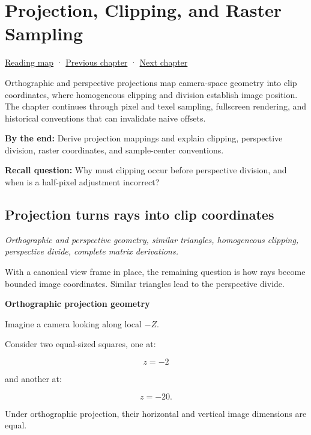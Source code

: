 \hypertarget{02-foundations-ii-ch033}{}
\chapter{Projection, Clipping, and Raster Sampling}\label{stagechapter:02-foundations-ii-ch033}\label{02-foundations-ii-ch033-projection-clipping-and-raster-sampling}

\hyperref[volume-reading-map]{Reading map} · \hyperref[02-foundations-ii-ch032-geometry-becomes-an-image-and-an-inverse-problem]{Previous chapter} · \hyperref[02-foundations-ii-ch034-robust-predicates-and-camera-sensitivity]{Next chapter}

Orthographic and perspective projections map camera-space geometry into clip coordinates, where homogeneous clipping and division establish image position. The chapter continues through pixel and texel sampling, fullscreen rendering, and historical conventions that can invalidate naive offsets.

\textbf{By the end:} Derive projection mappings and explain clipping, perspective division, raster coordinates, and sample-center conventions.

\textbf{Recall question:} Why must clipping occur before perspective division, and when is a half-pixel adjustment incorrect?

\section{Projection turns rays into clip coordinates}\label{02-foundations-ii-ch033-projection-turns-rays-into-clip-coordinates}

\emph{Orthographic and perspective geometry, similar triangles, homogeneous clipping, perspective divide, complete matrix derivations.}

With a canonical view frame in place, the remaining question is how rays become bounded image coordinates. Similar triangles lead to the perspective divide.

\textbf{Orthographic projection geometry}

Imagine a camera looking along local \(-Z\).

Consider two equal-sized squares, one at:

\[
 z=-2
\]

and another at:

\[
 z=-20.
\]

Under orthographic projection, their horizontal and vertical image dimensions are equal.

